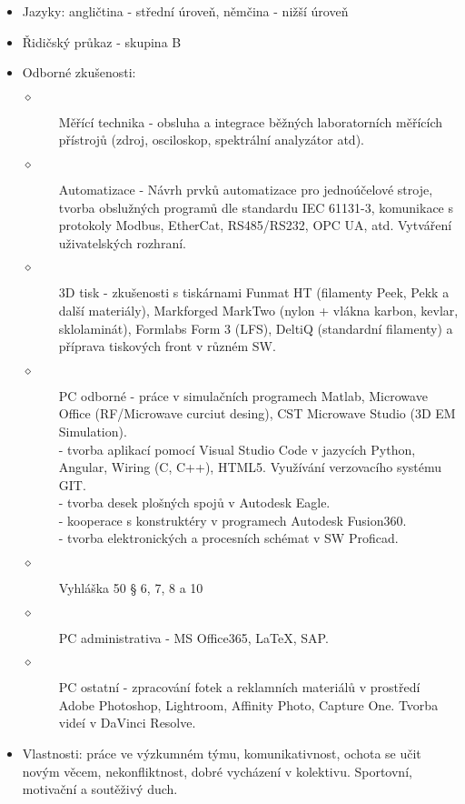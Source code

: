 \documentclass[12pt]{article}
\begin{document}
\begin{itemize}
\item Jazyky: angličtina - střední úroveň, němčina - nižší úroveň
\item Řidičský průkaz - skupina B
\item Odborné zkušenosti: 
\begin{description}
\item[$\diamond$]Měřící technika - obsluha a integrace běžných laboratorních měřících přístrojů (zdroj, osciloskop, spektrální analyzátor atd).
\item[$\diamond$]Automatizace - Návrh prvků automatizace pro jednoúčelové stroje, 
tvorba obslužných programů dle standardu IEC 61131-3, komunikace s protokoly Modbus, EtherCat, RS485/RS232, OPC UA, atd. Vytváření uživatelských rozhraní.
\item[$\diamond$]3D tisk - zkušenosti s tiskárnami Funmat HT (filamenty Peek, Pekk a další materiály), Markforged MarkTwo (nylon + vlákna karbon, kevlar, sklolaminát), Formlabs Form 3 (LFS), DeltiQ (standardní filamenty) a příprava tiskových front v různém SW. 
\item[$\diamond$]PC odborné - práce v simulačních programech Matlab, Microwave Office (RF/Microwave curciut desing), CST Microwave Studio (3D EM Simulation).\\
- tvorba aplikací pomocí Visual Studio Code v jazycích Python, Angular, Wiring (C, C++), HTML5. Využívání verzovacího systému GIT.\\
- tvorba desek plošných spojů v Autodesk Eagle.\\
- kooperace s konstruktéry v programech Autodesk Fusion360.\\
- tvorba elektronických a procesních schémat v SW Proficad.
\item[$\diamond$]Vyhláška 50 § 6, 7, 8 a 10
\item[$\diamond$]PC administrativa - MS Office365, \uv\LaTeX, SAP.

\item[$\diamond$]PC ostatní - zpracování fotek a reklamních materiálů v prostředí Adobe Photoshop, Lightroom, Affinity Photo, Capture One. Tvorba videí v DaVinci Resolve.
\end{description}       
\item Vlastnosti: práce ve výzkumném týmu, komunikativnost, ochota se učit novým věcem, nekonfliktnost, dobré vycházení v kolektivu. Sportovní, motivační a soutěživý duch.

\end{itemize}
\end{document}
